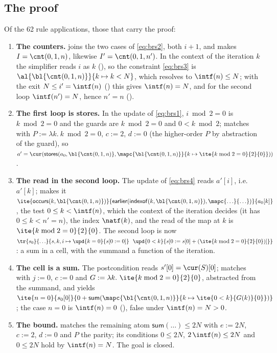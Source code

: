 \subsection{The proof}
Of the 62 rule applications, those that carry the proof:
\begin{enumerate}[nosep]
\item \textbf{The counters.}  joins the two cases of \eqref{eq:brs2}, both
  $i + 1$, and  makes $I = \cnt(0, 1, n)$, likewise $I' = \cnt(0, 1, n')$. In the
  context of the iteration $k$ the simplifier reads $i$ as $k$ (), so the constraint
  \eqref{eq:brs3} is $\al{\bl{\cnt(0, 1, n)}}{k \mapsto k < N}$, which 
  resolves to $\intf(n) \le N$; with the exit $N \le i' = \intf(n)$ () this gives
  $\intf(n) = N$, and for the second loop $\intf(n') = N$, hence $n' = n$ ().
\item \textbf{The first loop is stores.} In the update of \eqref{eq:brs1}, $i \bmod 2 = 0$ is $k \bmod 2 = 0$
  and the guards are $k \bmod 2 = 0$ and $0 < k \bmod 2$;  matches with
  $P := \lambda k.\ k \bmod 2 = 0$, $c := 2$, $d := 0$ (the higher-order $P$ by abstraction of the guard), so
  $a' = \cur(\mathsf{stores}(a_0, \bl{\cnt(0, 1, n)}, \mapc{\bl{\cnt(0, 1, n)}}{k \mapsto \ite{k \bmod 2 = 0}{2}{0}}))$.
\item \textbf{The read in the second loop.} The update of \eqref{eq:brs4} reads $a'[i]$, i.e.\ $a'[k]$;
   makes it $\ite{\mathsf{occurs}(k, \bl{\cnt(0, 1, n)})}{\mathsf{earlier}(\mathsf{indexof}(k, \bl{\cnt(0, 1, n)}), \mapc{\ldots}{\ldots})}{a_0[k]}$,
   the test $0 \le k < \intf(n)$, which the context of the iteration decides (it
  has $0 \le k < n' = n$),  the index $\natf(k)$, and the read of the map at $k$ is
  $\ite{k \bmod 2 = 0}{2}{0}$. The second loop is now
  $\tr{s_0}{\ldots}{s, k, i \mapsto \upd{k = 0}{s[0 := 0]}\ \ \upd{0 < k}{s[0 := s[0] + (\ite{k \bmod 2 = 0}{2}{0})]}}$:
  a sum in a cell, with the summand a function of the iteration.
\item \textbf{The cell is a sum.} The postcondition reads $s'[0] = \cur(S)[0]$;
   matches with $j := 0$, $c := 0$ and
  $G := \lambda k.\ \ite{k \bmod 2 = 0}{2}{0}$, abstracted from the summand, and yields
  $\ite{n = 0}{s_0[0]}{0 + \mathsf{sum}(\mapc{\bl{\cnt(0, 1, n)}}{k \mapsto \ite{0 < k}{G(k)}{0}})}$; the
  case $n = 0$ is $\intf(n) = 0$ (), false under $\intf(n) = N > 0$.
\item \textbf{The bound.}  matches the remaining atom
  $\mathsf{sum}(\ldots) \le 2N$ with $e := 2N$, $c := 2$, $d := 0$ and $P$ the parity; its conditions
  $0 \le 2N$, $2\,\intf(n) \le 2N$ and $0 \le 2N$ hold by $\intf(n) = N$. The goal is closed.
\end{enumerate}
